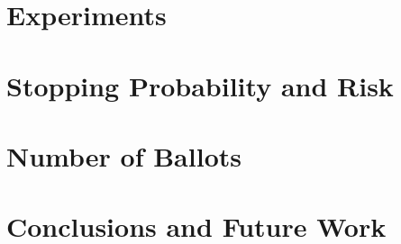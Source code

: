 \documentclass[runningheads]{llncs}
\begin{document}
%

\section{Experiments}
\label{sec:expts}


\section{Stopping Probability and Risk}
\label{sec:results1}


\section{Number of Ballots}
\label{sec:results2}


\section{Conclusions and Future Work}
\label{sec:conc}



%
%
%


%
\end{document}
